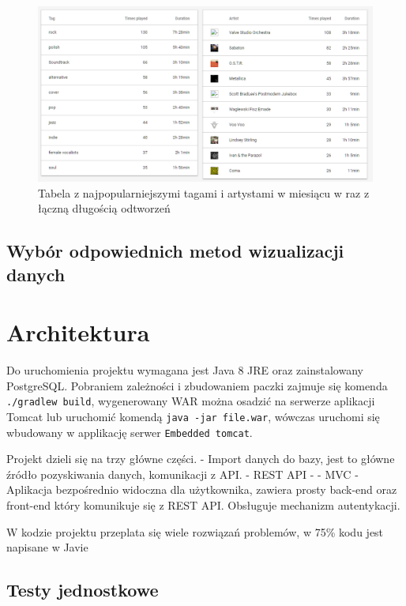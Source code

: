 \documentclass[brudnopis]{xmgr}
\begin{document}
    \begin{figure}
        \includegraphics[width=\linewidth]{fig/ui/table-popular-music-tags.png}
        \caption{Tabela z najpopularniejszymi tagami i artystami w miesiącu w raz z łączną długością odtworzeń}
        \label{fig:ui:table-popular-music-tags}
    \end{figure}

    \section{Wybór odpowiednich metod wizualizacji danych}


\chapter{Architektura}

    Do uruchomienia projektu wymagana jest Java 8 JRE oraz zainstalowany PostgreSQL.
    Pobraniem zależności i zbudowaniem paczki zajmuje się komenda \verb|./gradlew build|,
    wygenerowany WAR można osadzić na serwerze aplikacji Tomcat lub uruchomić komendą \verb|java -jar file.war|,
    wówczas uruchomi się wbudowany w applikację serwer \verb|Embedded tomcat|.

    Projekt dzieli się na trzy główne części.
    - Import danych do bazy, jest to główne źródło pozyskiwania danych, komunikacji z API.
    - REST API - %
    - MVC - Aplikacja bezpośrednio widoczna dla użytkownika, zawiera prosty back-end oraz front-end który komunikuje się z REST API.
    Obsługuje mechanizm autentykacji.

    W kodzie projektu przeplata się wiele rozwiązań problemów, w 75\% kodu jest napisane w Javie

\section{Testy jednostkowe}
\end{document}
